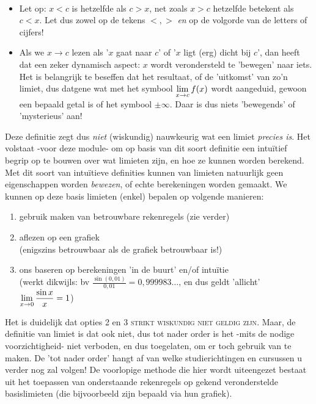 \documentclass[numbers,wordchoicegiven]{ximera}
\begin{document}
\begin{remark} \ 

\begin{itemize}	
\item Let op: $x<c$ is hetzelfde als  $c>x$, net zoals  $x>c$ hetzelfde betekent als $c<x$. Let dus zowel op de tekens $<,>$ \textit{en} op de volgorde van de letters of cijfers!  

\item Als we  $x\to c$ lezen als '$x$ gaat naar $c$' of '$x$ ligt (erg) dicht bij $c$', dan heeft dat een zeker dynamisch aspect: $x$ wordt verondersteld te 'bewegen' naar iets. Het is belangrijk te beseffen dat het resultaat, of de 'uitkomst' van zo'n limiet, dus datgene wat met het symbool $\limxc f(x)$ wordt aangeduid, gewoon een bepaald getal is of het symbool $\pm\infty$. Daar is dus niets 'bewegends' of 'mysterieus' aan!
\end{itemize}

\end{remark}


Deze definitie zegt dus \textit{niet} (wiskundig) nauwkeurig wat een limiet \textit{precies is}. Het volstaat -voor deze module- om op basis van dit soort definitie een intuïtief begrip op te bouwen over wat limieten zijn, en hoe ze kunnen worden berekend. Met dit soort van intuïtieve definities kunnen van limieten natuurlijk geen eigenschappen worden \textit{bewezen}, of echte berekeningen worden gemaakt. We kunnen op deze basis limieten (enkel) bepalen op volgende manieren:
\begin{enumerate}
	\item gebruik maken van betrouwbare rekenregels (zie verder)
	\item aflezen op een grafiek  
	\\(enigszins betrouwbaar als de grafiek betrouwbaar is!)
	\item ons baseren op berekeningen 'in de buurt' en/of intuïtie 
	\\(werkt dikwijls: bv $\frac{\sin(0,01)}{0,01}=0,999983\dots$, en dus geldt 'allicht' $\limx \frac{\sin x}{x} = 1$)
\end{enumerate}
Het is duidelijk dat opties 2 en  3 \textsc{strikt wiskundig niet geldig zijn}. Maar, de definitie van limiet is dat ook niet, dus tot nader order is het -mits de nodige voorzichtigheid- niet verboden, en dus toegelaten, om er toch gebruik van te maken. De 'tot nader order' hangt af van welke studierichtingen en cursussen u verder nog zal volgen! De voorlopige methode die hier wordt uiteengezet bestaat uit het toepassen van onderstaande rekenregels op gekend veronderstelde basislimieten (die bijvoorbeeld zijn bepaald via hun grafiek). 
\end{document}
